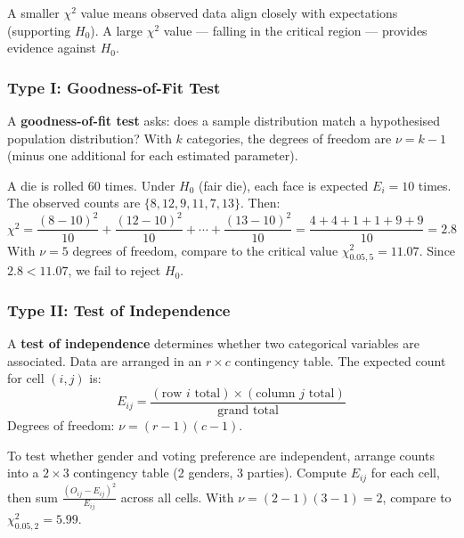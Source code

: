 \begin{remark}
A smaller $\chi^2$ value means observed data align closely with expectations (supporting $H_0$). A large $\chi^2$ value — falling in the critical region — provides evidence against $H_0$.
\end{remark}

\subsubsection*{Type I: Goodness-of-Fit Test}

\begin{definition}
A \textbf{goodness-of-fit test} asks: does a sample distribution match a hypothesised population distribution? With $k$ categories, the degrees of freedom are $\nu = k - 1$ (minus one additional for each estimated parameter).
\end{definition}

\begin{example}
A die is rolled 60 times. Under $H_0$ (fair die), each face is expected $E_i = 10$ times. The observed counts are $\{8, 12, 9, 11, 7, 13\}$. Then:
\[
\chi^2 = \frac{(8-10)^2}{10} + \frac{(12-10)^2}{10} + \cdots + \frac{(13-10)^2}{10} = \frac{4+4+1+1+9+9}{10} = 2.8
\]
With $\nu = 5$ degrees of freedom, compare to the critical value $\chi^2_{0.05,5} = 11.07$. Since $2.8 < 11.07$, we fail to reject $H_0$.
\end{example}

\subsubsection*{Type II: Test of Independence}

\begin{definition}
A \textbf{test of independence} determines whether two categorical variables are associated. Data are arranged in an $r \times c$ contingency table. The expected count for cell $(i,j)$ is:
\[
E_{ij} = \frac{(\text{row } i \text{ total}) \times (\text{column } j \text{ total})}{\text{grand total}}
\]
Degrees of freedom: $\nu = (r-1)(c-1)$.
\end{definition}

\begin{example}
To test whether gender and voting preference are independent, arrange counts into a $2 \times 3$ contingency table (2 genders, 3 parties). Compute $E_{ij}$ for each cell, then sum $\frac{(O_{ij}-E_{ij})^2}{E_{ij}}$ across all cells. With $\nu = (2-1)(3-1) = 2$, compare to $\chi^2_{0.05,2} = 5.99$.
\end{example}

